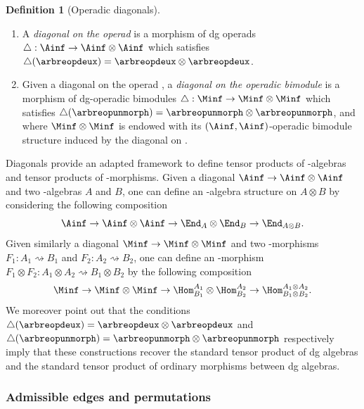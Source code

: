 \documentclass[JEP,XML,SOM,NoFloatCountersInSection,Unicode,published]{cedram}
\theoremstyle{definition}
\newtheorem{definition}{Definition}[section]
\theoremstyle{plain}
\begin{document}


\skpt
\begin{definition}[Operadic diagonals]
\begin{enumerate}
\item A \emph{diagonal on the operad \Ainf} is a morphism of dg operads $\triangle : \Ainf \to \Ainf \otimes \Ainf$ which satisfies $\triangle (\arbreopdeux) = \arbreopdeux \otimes \arbreopdeux$.
\item Given a diagonal on the operad \Ainf, a \emph{diagonal on the operadic bimodule \Minf} is a morphism of dg-operadic bimodules $\triangle : \Minf \to \Minf \otimes \Minf$ which satisfies $\triangle (\arbreopunmorph) = \arbreopunmorph \otimes \arbreopunmorph$, and where $\Minf \otimes \Minf$ is endowed with its $(\Ainf, \Ainf)$-operadic bimodule structure induced by the diagonal on \Ainf.
\end{enumerate}
\end{definition}

Diagonals provide an adapted framework to define tensor products of \Ainf -algebras and tensor products of \Ainf -morphisms.
Given a diagonal $\Ainf \to \Ainf \otimes \Ainf$ and two \Ainf -algebras $A$ and $B$, one can define an \Ainf -algebra structure on $A \otimes B$ by considering the following composition
\[
\Ainf \to \Ainf \otimes \Ainf \to \End_A \otimes \End_B \to \End_{A \otimes B}.
\]
Given similarly a diagonal $\Minf \to \Minf \otimes \Minf$ and two \Ainf -morphisms $F_1 : A_1 \rightsquigarrow B_1$ and $F_2 : A_2 \rightsquigarrow B_2$, one can define an \Ainf -morphism $F_1 \otimes F_2 : A_1 \otimes A_2 \rightsquigarrow B_1 \otimes B_2$ by the following composition
\[
\Minf \to \Minf \otimes \Minf \to \Hom^{A_1}_{B_1} \otimes \Hom^{A_2}_{B_2} \to \Hom^{A_1 \otimes A_2}_{B_1 \otimes B_2}.
\]
We moreover point out that the conditions $\triangle (\arbreopdeux) = \arbreopdeux \otimes \arbreopdeux$ and $\triangle (\arbreopunmorph) = \arbreopunmorph \otimes \arbreopunmorph$ respectively imply that these constructions recover the standard tensor product of dg algebras and the standard tensor product of ordinary morphisms between dg algebras.

\subsubsection{Admissible edges and permutations}
\end{document}
